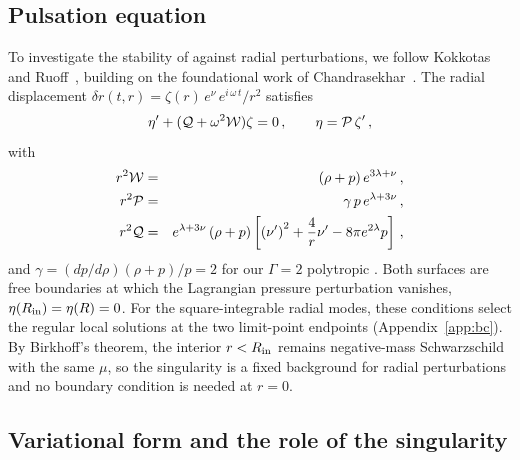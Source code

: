 \documentclass[%
 reprint,
 amsmath,amssymb,
 aps,prd,
 superscriptaddress,
]{revtex4-2}
\begin{document}
\subsection{Pulsation equation}

To investigate the stability of  against radial perturbations, we follow Kokkotas and Ruoff~\cite{kostas_radial}, building on the foundational work of Chandrasekhar~\cite{Chandrasekhar1964a,Chandrasekhar1964b,ChandrasekharTooper1964}. The radial displacement $\delta r(t,r) = \zeta(r)\,e^\nu\,e^{i\,\omega\,t}/r^2$ satisfies
\begin{equation}
\eta' + ({\cal Q} + \omega^2 {\cal W})\zeta = 0\,,\qquad \eta = {\cal P}\,\zeta'\,,
\label{eq:master}
\end{equation}
with
\begin{eqnarray*}
    r^2 {\cal W} &=& (\rho + p)\, e^{3\lambda + \nu}\,,\\
    r^2 {\cal P} &=& \gamma\, p\, e^{\lambda + 3\nu}\,, \\
    r^2 {\cal Q} &=& e^{\lambda + 3\nu} \,(\rho + p)
    \left[ \left(\nu'\right)^2 + \frac{4}{r}\nu' - 8\pi e^{2\lambda} p \right]\,,
\end{eqnarray*}
and $\gamma = (dp/d\rho)(\rho+p)/p=2$ for our $\Gamma = 2$ polytropic \eos{}. Both surfaces are free boundaries at which the Lagrangian pressure perturbation vanishes, $\eta(R_{\rm in})=\eta(R)=0$. For the square-integrable radial modes, these conditions select the regular local solutions at the two limit-point endpoints (Appendix~\ref{app:bc}). By Birkhoff's theorem, the interior $r<R_{\rm in}$ remains negative-mass Schwarzschild with the same $\mu$, so the singularity is a fixed background for radial perturbations and no boundary condition is needed at $r=0$.

\subsection{Variational form and the role of the singularity}
\end{document}
